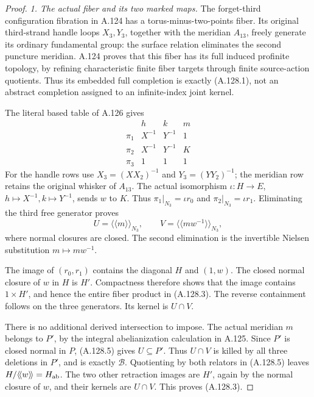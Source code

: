 \begin{proof}
\emph{1. The actual fiber and its two marked maps.}
The forget-third configuration fibration in A.124 has a
torus-minus-two-points fiber. Its original third-strand handle
loops \(X_3,Y_3\), together with the meridian \(A_{13}\),
freely generate its ordinary fundamental group: the surface
relation eliminates the second puncture meridian. A.124 proves
that this fiber has its full induced profinite topology, by
refining characteristic finite fiber targets through finite
source-action quotients. Thus its embedded full completion is
exactly (A.128.1), not an abstract completion assigned to an
infinite-index joint kernel.

The literal based table of A.126 gives
\[
 \begin{array}{c|ccc}
       &h&k&m\\\hline
 \pi_1&X^{-1}&Y^{-1}&1\\
 \pi_2&X^{-1}&Y^{-1}&K\\
 \pi_3&1&1&1
 \end{array}                                             \tag{A.128.4}
\]
For the handle rows use \(X_3=(XX_2)^{-1}\) and
\(Y_3=(YY_2)^{-1}\); the meridian row retains the original
whisker of \(A_{13}\). The actual isomorphism
\(\iota:H\to E\), \(h\mapsto X^{-1},k\mapsto Y^{-1}\),
sends \(w\) to \(K\). Thus
\(\pi_1|_{N_3}=\iota r_0\) and
\(\pi_2|_{N_3}=\iota r_1\).
Eliminating the third free generator proves
\[
 U=\langle\!\langle m\rangle\!\rangle_{N_3},\qquad
 V=\langle\!\langle mw^{-1}\rangle\!\rangle_{N_3},          \tag{A.128.5}
\]
where normal closures are closed. The second elimination is the
invertible Nielsen substitution \(m\mapsto mw^{-1}\).

The image of \((r_0,r_1)\) contains the diagonal \(H\) and
\((1,w)\). The closed normal closure of \(w\) in \(H\)
is \(H'\). Compactness therefore shows that the image contains
\(1\times H'\), and hence the entire fiber product in
(A.128.3). The reverse containment follows on the three
generators. Its kernel is \(U\cap V\).

There is no additional derived intersection to impose.
The actual meridian \(m\) belongs to \(P'\), by the integral
abelianization calculation in A.125. Since \(P'\) is closed
normal in \(P\), (A.128.5) gives \(U\subseteq P'\).
Thus \(U\cap V\) is killed by all three deletions in \(P'\),
and is exactly \(\mathcal B\). Quotienting by both relators
in (A.128.5) leaves \(H/\langle\!\langle w\rangle\!\rangle
=H_{\rm ab}\). The two other retraction images are \(H'\),
again by the normal closure of \(w\), and their kernels are
\(U\cap V\). This proves (A.128.3).


\end{proof}

